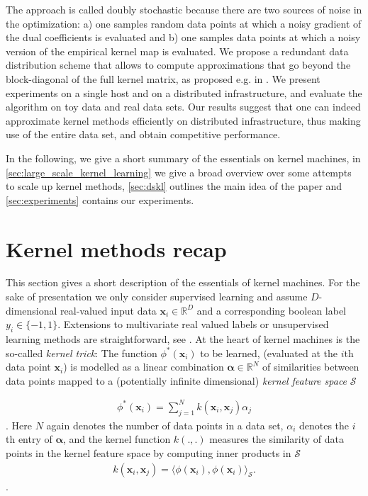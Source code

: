 \documentclass{article} %
\newcommand{\R}{\ensuremath{\mathds{R}}}
\newcommand{\va}{\boldsymbol{\alpha}}
\newcommand{\Bx}{\mathbf{x}}
\begin{document}
The approach is called doubly stochastic because there are two sources of noise in the optimization: a) one samples random data points at which a noisy gradient of the dual coefficients is evaluated and b) one samples data points at which a noisy version of the empirical kernel map is evaluated. We propose a redundant data distribution scheme that allows to compute approximations that go beyond the block-diagonal of the full kernel matrix, as proposed e.g. in \cite{Deisenroth2015}. We present experiments on a single host and on a distributed infrastructure, and evaluate the algorithm on toy data and real data sets. Our results suggest that one can indeed approximate kernel methods efficiently on distributed infrastructure, thus making use of the entire data set, and obtain competitive performance. 

In the following, we give a short summary of the essentials on kernel machines, in \autoref{sec:large_scale_kernel_learning} we give a broad overview over some attempts to scale up kernel methods, \autoref{sec:dskl} outlines the main idea of the paper and \autoref{sec:experiments} contains our experiments.

\section{Kernel methods recap}\label{sec:kernels}
This section gives a short description of the essentials of kernel machines. For the sake of presentation we only consider supervised learning and assume $D$-dimensional real-valued input data $\Bx_i\in\R^D$ and a corresponding boolean label $y_i\in\{-1,1\}$. Extensions to multivariate real valued labels or unsupervised learning methods are straightforward, see  \cite{Lopez-Paz2014}. At the heart of kernel machines is the so-called {\em kernel trick}: The function $\phi^*(\Bx_i)$ to be learned, (evaluated at the $i$th data point $\Bx_i$) is modelled as a linear combination $\va\in\R^N$ of similarities between data points mapped to a (potentially infinite dimensional) {\em kernel feature space} $\mathcal{S}$

\begin{align}\label{eq:kernel_trick}
\phi^*(\Bx_i)=\sum_{j=1}^N k(\Bx_i,\Bx_j)\alpha_j
\end{align}.
Here $N$ again denotes the number of data points in a data set, $\alpha_i$ denotes the $i$th entry of $\va$, and the kernel function $k(.,.)$ measures the similarity of data points in the kernel feature space by computing inner products in $\mathcal{S}$
\begin{align}\label{eq:kernel_function}
k(\Bx_i,\Bx_j)=\langle \phi(\Bx_i), \phi(\Bx_i)\rangle_{\mathcal{S}}.
\end{align}.
%
\end{document}
